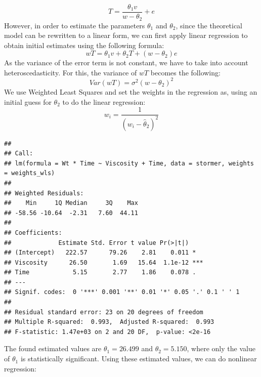 \documentclass[
  11pt,
]{article}
\newenvironment{Shaded}{\begin{snugshade}}{\end{snugshade}}
\newcommand{\AttributeTok}[1]{\textcolor[rgb]{0.13,0.29,0.53}{#1}}
\newcommand{\DecValTok}[1]{\textcolor[rgb]{0.00,0.00,0.81}{#1}}
\newcommand{\FunctionTok}[1]{\textcolor[rgb]{0.13,0.29,0.53}{\textbf{#1}}}
\newcommand{\NormalTok}[1]{#1}
\newcommand{\OtherTok}[1]{\textcolor[rgb]{0.56,0.35,0.01}{#1}}
\newcommand{\SpecialCharTok}[1]{\textcolor[rgb]{0.81,0.36,0.00}{\textbf{#1}}}
\begin{document}
\[ 
T = \frac{\theta_1 v}{w - \theta_2} + e
\] However, in order to estimate the parameters \(\theta_1\) and
\(\theta_2\), since the theoretical model can be rewritten to a linear
form, we can first apply linear regression to obtain initial estimates
using the following formula: \[
wT = \theta_1 v + \theta_2 T + (w - \theta_2)e
\] As the variance of the error term is not constant, we have to take
into account heteroscedasticity. For this, the variance of \(wT\)
becomes the following: \[
Var(wT) = \sigma^2(w - \theta_2)^2
\] We use Weighted Least Squares and set the weights in the regression
as, using an initial guess for \(\theta_2\) to do the linear regression:
\[
w_i = \frac{1}{(w_i - \hat{\theta}_2)^2}
\]

\begin{Shaded}
\end{Shaded}

\begin{verbatim}
## 
## Call:
## lm(formula = Wt * Time ~ Viscosity + Time, data = stormer, weights = weights_wls)
## 
## Weighted Residuals:
##    Min     1Q Median     3Q    Max 
## -58.56 -10.64  -2.31   7.60  44.11 
## 
## Coefficients:
##             Estimate Std. Error t value Pr(>|t|)    
## (Intercept)   222.57      79.26    2.81    0.011 *  
## Viscosity      26.50       1.69   15.64  1.1e-12 ***
## Time            5.15       2.77    1.86    0.078 .  
## ---
## Signif. codes:  0 '***' 0.001 '**' 0.01 '*' 0.05 '.' 0.1 ' ' 1
## 
## Residual standard error: 23 on 20 degrees of freedom
## Multiple R-squared:  0.993,  Adjusted R-squared:  0.993 
## F-statistic: 1.47e+03 on 2 and 20 DF,  p-value: <2e-16
\end{verbatim}

The found estimated values are \(\theta_1 = 26.499\) and
\(\theta_2 = 5.150\), where only the value of \(\theta_1\) is
statistically significant. Using these estimated values, we can do
nonlinear regression:
\end{document}
